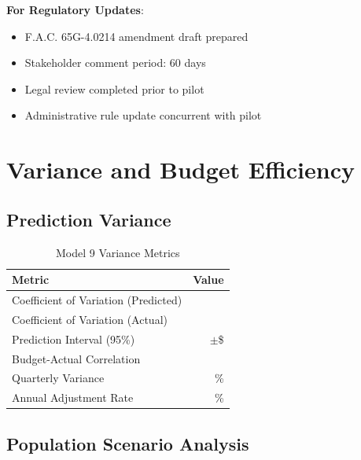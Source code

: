 \textbf{For Regulatory Updates}:
\begin{itemize}
    \item F.A.C. 65G-4.0214 amendment draft prepared
    \item Stakeholder comment period: 60 days
    \item Legal review completed prior to pilot
    \item Administrative rule update concurrent with pilot
\end{itemize}

\section{Variance and Budget Efficiency}

\subsection{Prediction Variance}

\begin{table}[h]
\centering
\caption{Model 9 Variance Metrics}
\begin{tabular}{lr}
\toprule
\textbf{Metric} & \textbf{Value} \\
\midrule
Coefficient of Variation (Predicted) & \ModelNineCVPredicted{} \\
Coefficient of Variation (Actual) & \ModelNineCVActual{} \\
Prediction Interval (95\%) & $\pm$\$\ModelNinePredictionInterval{} \\
Budget-Actual Correlation & \ModelNineBudgetActualCorr{} \\
Quarterly Variance & \ModelNineQuarterlyVariance{}\% \\
Annual Adjustment Rate & \ModelNineAnnualAdjustmentRate{}\% \\
\bottomrule
\end{tabular}
\label{tab:model9_variance}
\end{table}

\subsection{Population Scenario Analysis}

